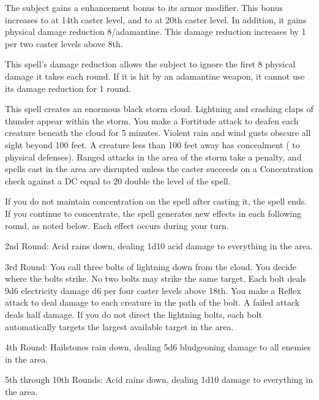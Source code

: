 \spelldur{\durshort}
\begin{spelleffect}
    The subject gains a  enhancement bonus to its armor modifier. This bonus increases to  at 14th caster level, and to  at 20th caster level. In addition, it gains physical damage reduction 8/adamantine. This damage reduction increases by 1 per two caster levels above 8th.
\end{spelleffect}
\begin{spellnotes}
    This spell's damage reduction allows the subject to ignore the first 8 physical damage it takes each round. If it is hit by an adamantine weapon, it cannot use its damage reduction for 1 round.
\end{spellnotes}

\begin{spelleffect}
    This spell creates an enormous black storm cloud. Lightning and crashing claps of thunder appear within the storm. You make a Fortitude attack to deafen each creature beneath the cloud for 5 minutes. Violent rain and wind gusts obscure all sight beyond 100 feet. A creature less than 100 feet away has concealment ( to physical defenses). Ranged attacks in the area of the storm take a  penalty, and spells cast in the area are disrupted unless the caster succeeds on a Concentration check against a DC equal to 20 \add double the level of the spell.
    \par If you do not maintain concentration on the spell after casting it, the spell ends. If you continue to concentrate, the spell generates new effects in each following round, as noted below. Each effect occurs during your turn.
    \par 2nd Round: Acid rains down, dealing 1d10 acid damage to everything in the area.
    \par 3rd Round: You call three bolts of lightning down from the cloud. You decide where the bolts strike. No two bolts may strike the same target. Each bolt deals 9d6 electricity damage \add d6 per four caster levels above 18th. You make a Reflex attack to deal damage to each creature in the path of the bolt. A failed attack deals half damage. If you do not direct the lightning bolts, each bolt automatically targets the largest available target in the area.
    \par 4th Round: Hailstones rain down, dealing 5d6 bludgeoning damage to all enemies in the area.
    \par 5th through 10th Rounds: Acid rains down, dealing 1d10 damage to everything in the area.
\end{spelleffect}


